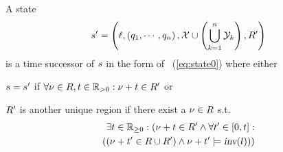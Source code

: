 \begin{definition}
A state
\begin{align*}
    s'
    =
    \left (
        \ell
        ,
        \left (
            q_1,
            \cdots,
            q_n
        \right )
        ,
        \mathcal{X} \cup \left( \bigcup_{k=1}^{n} \mathcal{Y}_k \right )
        ,
        R'
    \right )
\end{align*}
is a time successor of $s$ in the form of ~(\ref{eq:state0}) where either 
\begin{compactitem}
    \item 
        $s = s'$ if 
        $
            \forall \nu \in R, t \in \mathbb{R}_{>0} : \nu + t \in R'
        $ or
    \item 
        $R'$ is another unique region if there exist a $ \nu \in R $ s.t.
        \begin{align*}
            \exists t \in \mathbb{R}_{\ge0} : (
                \nu + t \in R' 
                \land
                \forall t' \in [0,t] : \\ \left (
                    \left (
                        \nu + t' \in R \cup R'
                    \right )
                    \land
                    \nu + t' \models \mbox{\sl inv}(l)
                \right )
            )
        \end{align*}
\end{compactitem}
\end{definition}


